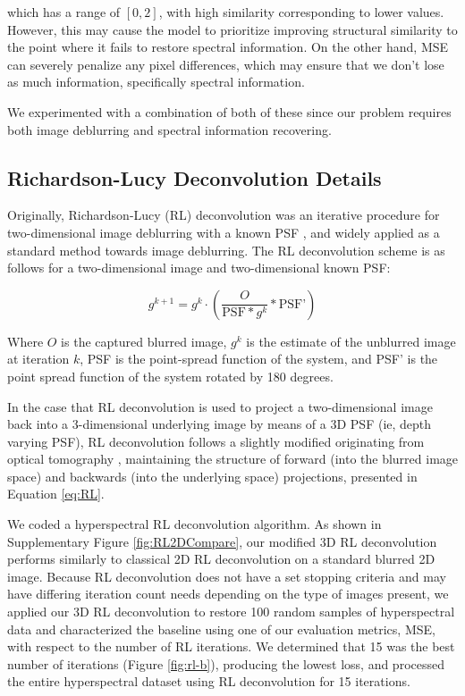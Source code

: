 \documentclass{article}
\begin{document}
which has a range of $[0, 2]$, with high similarity corresponding to lower values. However, this may cause the model to prioritize improving structural similarity to the point where it fails to restore spectral information. On the other hand, MSE can severely penalize any pixel differences, which may ensure that we don't lose as much information, specifically spectral information. 

We experimented with a combination of both of these since our problem requires both image deblurring and spectral information recovering.

\subsection{Richardson-Lucy Deconvolution Details}
\label{appendix:RL}
Originally, Richardson-Lucy (RL) deconvolution was an iterative procedure for two-dimensional image deblurring with a known PSF \cite{lucy1974iterative}\cite{richardson1972bayesian}, and widely applied as a standard method towards image deblurring. The RL deconvolution scheme is as follows for a two-dimensional image and two-dimensional known PSF:

\begin{equation}
    g^{k+1} = g^{k} \cdot \left(\frac{O}{\text{PSF} \ast g^{k} } \ast \text{PSF'}\right)
\end{equation}

Where $O$ is the captured blurred image, $g^{k}$ is the estimate of the unblurred image at iteration $k$, PSF is the point-spread function of the system, and PSF' is the point spread function of the system rotated by 180 degrees. 

In the case that RL deconvolution is used to project a two-dimensional image back into a 3-dimensional underlying image by means of a 3D PSF (ie, depth varying PSF), RL deconvolution follows a slightly modified originating from optical tomography \cite{broxton2013wave}\cite{guo2019fourier}, maintaining the structure of forward (into the blurred image space) and backwards (into the underlying space) projections, presented in Equation \ref{eq:RL}.

We coded a hyperspectral RL deconvolution algorithm. As shown in Supplementary Figure \ref{fig:RL2DCompare}, our modified 3D RL deconvolution performs similarly to classical 2D RL deconvolution on a standard blurred 2D image. Because RL deconvolution does not have a set stopping criteria and may have differing iteration count needs depending on the type of images present, we applied our 3D RL deconvolution to restore 100 random samples of hyperspectral data and characterized the baseline using one of our evaluation metrics, MSE, with respect to the number of RL iterations. We determined that 15 was the best number of iterations (Figure \ref{fig:rl-b}), producing the lowest loss, and processed the entire hyperspectral dataset using RL deconvolution for 15 iterations.
\end{document}

